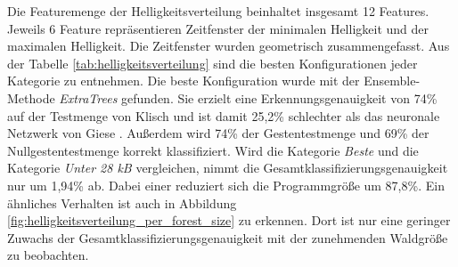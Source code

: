 Die Featuremenge der Helligkeitsverteilung beinhaltet insgesamt 12 Features. Jeweils 6 Feature repräsentieren Zeitfenster der minimalen Helligkeit und der maximalen Helligkeit. Die Zeitfenster wurden
geometrisch zusammengefasst.
\newline
\newline
Aus der Tabelle \ref{tab:helligkeitsverteilung} sind die besten Konfigurationen jeder Kategorie zu entnehmen. Die beste Konfiguration wurde mit der Ensemble-Methode \textit{ExtraTrees} gefunden.
Sie erzielt eine Erkennungsgenauigkeit von 74\% auf der Testmenge von Klisch und ist damit 25,2\% schlechter als das neuronale Netzwerk von Giese \cite{gieseThesis}. Außerdem wird 74\% der Gestentestmenge
und 69\% der Nullgestentestmenge korrekt klassifiziert.
\newline
\newline
Wird die Kategorie \textit{Beste} und die Kategorie \textit{Unter 28 kB} vergleichen, nimmt die Gesamtklassifizierungsgenauigkeit nur um 1,94\% ab. Dabei einer reduziert sich die Programmgröße um 87,8\%.
Ein ähnliches Verhalten ist auch in Abbildung \ref{fig:helligkeitsverteilung_per_forest_size} zu erkennen. Dort ist nur eine geringer Zuwachs der Gesamtklassifizierungsgenauigkeit mit der zunehmenden
Waldgröße zu beobachten.